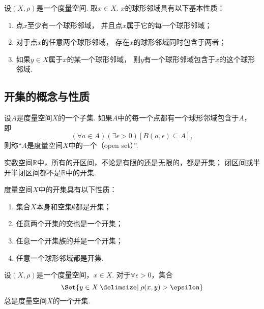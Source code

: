 \begin{theorem}\label{theorem:度量空间.球形邻域的性质}
设\((X,\rho)\)是一个度量空间.
取\(x \in X\).
\(x\)的球形邻域具有以下基本性质：
\begin{enumerate}
	\item 点\(x\)至少有一个球形邻域，
	并且点\(x\)属于它的每一个球形邻域；
	\item 对于点\(x\)的任意两个球形邻域，
	存在\(x\)的球形邻域同时包含于两者；
	\item 如果\(y \in X\)属于\(x\)的某一个球形邻域，
	则\(y\)有一个球形邻域包含于\(x\)的这个球形邻域.
\end{enumerate}
\end{theorem}

\subsection{开集的概念与性质}
\begin{definition}\label{definition:度量空间.开集的概念}
设\(A\)是度量空间\(X\)的一个子集.
如果\(A\)中的每一个点都有一个球形邻域包含于\(A\)，
即\[
	(\forall a \in A)
	(\exists\epsilon>0)
	[B(a,\epsilon) \subseteq A],
\]
则称“\(A\)是度量空间\(X\)中的一个（open set）”.
\end{definition}

\begin{example}
实数空间\(\mathbb{R}\)中，所有的开区间，不论是有限的还是无限的，都是开集；
闭区间或半开半闭区间都不是\(\mathbb{R}\)中的开集.
\end{example}

\begin{theorem}\label{theorem:度量空间.开集的性质}
度量空间\(X\)中的开集具有以下性质：
\begin{enumerate}
\item 集合\(X\)本身和空集\(\emptyset\)都是开集；
\item 任意两个开集的交也是一个开集；
\item 任意一个开集族的并是一个开集；
\item 任意一个球形邻域都是开集.
\end{enumerate}
\end{theorem}

\begin{proposition}
设\((X,\rho)\)是一个度量空间，\(x \in X\).
对于\(\forall\epsilon>0\)，集合\[
	\Set{ y \in X \given \rho(x,y) > \epsilon }
\]总是度量空间\(X\)的一个开集.
\end{proposition}

